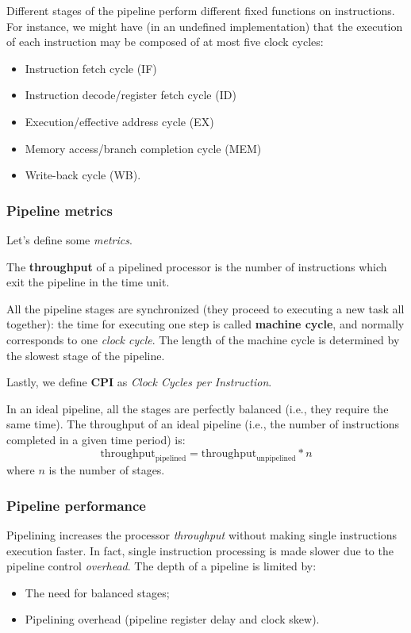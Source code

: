 \documentclass[a4paper,11pt]{article}
\begin{document}
Different stages of the pipeline perform different fixed functions on instructions.
For instance, we might have (in an undefined implementation) that the execution of each instruction may be composed of at most five clock cycles:
\begin{itemize}
	\item Instruction fetch cycle (IF)
	\item Instruction decode/register fetch cycle (ID)
	\item Execution/effective address cycle (EX)
	\item Memory access/branch completion cycle (MEM)
	\item Write-back cycle (WB).
\end{itemize}

\subsubsection{Pipeline metrics}

Let's define some \textit{metrics}.

The \textbf{throughput} of a pipelined processor is the number of instructions which exit the pipeline in the time unit.

All the pipeline stages are synchronized (they proceed to executing a new task all together): the time for executing one step is called \textbf{machine cycle}, and normally corresponds to one \textit{clock cycle}.
The length of the machine cycle is determined by the slowest stage of the pipeline.

Lastly, we define \textbf{CPI} as \textit{Clock Cycles per Instruction}.

In an ideal pipeline, all the stages are perfectly balanced (i.e., they require the same time).
The throughput of an ideal pipeline (i.e., the number of instructions completed in a given time period) is:
$$
	\text{throughput}_\text{pipelined} = \text{throughput}_\text{unpipelined} * n
$$
where $n$ is the number of stages.

\subsubsection{Pipeline performance}

Pipelining increases the processor \textit{throughput} without making single instructions execution faster.
In fact, single instruction processing is made slower due to the pipeline control \textit{overhead}.
The depth of a pipeline is limited by:
\begin{itemize}
	\item The need for balanced stages;
	\item Pipelining overhead (pipeline register delay and clock skew).
\end{itemize}
\end{document}
